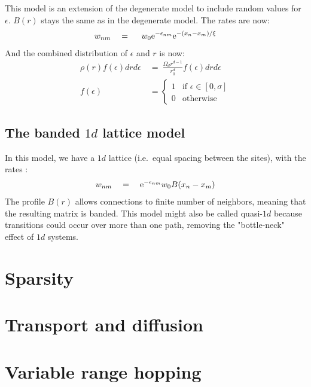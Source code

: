 This model is an extension of the degenerate model to include
random values for $\epsilon$. $B(r)$ stays the same as in the degenerate model.
The rates are now:
%
\begin{align}\label{eq:mott_hopping_rates}
w_{nm} \quad = \quad \ w_0 \mbox{e}^{-\epsilon_{nm}}\mbox{e}^{-(x_n-x_m)/\xi}
\end{align}
%
And the combined distribution of $\epsilon$ and $r$ is now:
%
\begin{align}\label{eq:mott_distribution}
\rho(r)f(\epsilon)drd\epsilon \ &=\ \frac{\Omega_d r^{d-1}}{r_0^d} f(\epsilon) dr d\epsilon \\
f(\epsilon)\ &= 
  \begin{cases} 
    1 &\textrm{if   } \epsilon \in [0,\sigma] \\
    0 &\textrm{otherwise}
  \end{cases}
\end{align}
%


\subsection{The banded $1d$ lattice model}

In this model, we have a $1d$ lattice (i.e.\ equal spacing between the sites), 
with the rates :
%
\begin{align}
w_{nm} \quad = \quad \mbox{e}^{-\epsilon_{nm}}w_0 B(x_n-x_m)
\end{align}
%
The profile $B(r)$ allows connections to finite number of neighbors,
meaning that the resulting matrix is banded. This model might also
be called quasi-$1d$ because transitions could occur over more
than one path, removing the "bottle-neck" effect of $1d$ systems.


\section{Sparsity}

\cite{cohen_energy_2012}

\section{Transport and diffusion}


\section{Variable range hopping}


